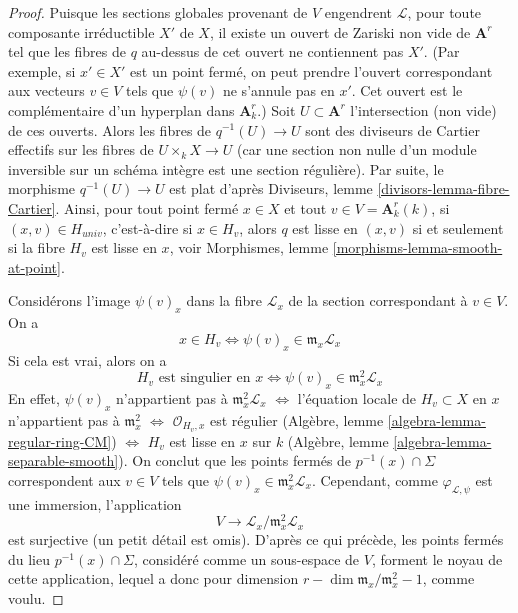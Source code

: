 \begin{proof}
\medskip\noindent
Puisque les sections globales provenant de $V$ engendrent $\mathcal{L}$, pour toute composante irréductible
$X'$ de $X$, il existe un ouvert de Zariski non vide de $\mathbf{A}^r$ tel que les
fibres de $q$ au-dessus de cet ouvert ne contiennent pas $X'$. (Par exemple, si $x' \in X'$
est un point fermé, on peut prendre l'ouvert correspondant aux
vecteurs $v \in V$ tels que $\psi(v)$ ne s'annule pas en $x'$. Cet
ouvert est le complémentaire d'un hyperplan dans $\mathbf{A}^r_k$.)
Soit $U \subset \mathbf{A}^r$ l'intersection (non vide) de ces ouverts.
Alors les fibres de $q^{-1}(U) \to U$ sont des diviseurs de Cartier effectifs
sur les fibres de $U \times_k X \to U$ (car une section non nulle
d'un module inversible sur un schéma intègre est une section régulière). Par suite, le
morphisme $q^{-1}(U) \to U$ est plat d'après
Diviseurs, lemme \ref{divisors-lemma-fibre-Cartier}.
Ainsi, pour tout point fermé $x \in X$ et tout $v \in V = \mathbf{A}^r_k(k)$,
si $(x, v) \in H_{univ}$, c'est-à-dire si $x \in H_v$,
alors $q$ est lisse en $(x, v)$ si et seulement si la fibre
$H_v$ est lisse en $x$, voir
Morphismes, lemme \ref{morphisms-lemma-smooth-at-point}.

\medskip\noindent
Considérons l'image $\psi(v)_x$ dans la fibre $\mathcal{L}_x$
de la section correspondant à $v \in V$. On a
$$
x \in H_v \Leftrightarrow \psi(v)_x \in \mathfrak m_x\mathcal{L}_x
$$
Si cela est vrai, alors on a
$$
H_v\text{ est singulier en }x \Leftrightarrow
\psi(v)_x \in \mathfrak m_x^2\mathcal{L}_x
$$
En effet, $\psi(v)_x$ n'appartient pas à $\mathfrak m_x^2\mathcal{L}_x$
$\Leftrightarrow$
l'équation locale de $H_v \subset X$ en $x$ n'appartient pas
à $\mathfrak m_x^2$
$\Leftrightarrow$
$\mathcal{O}_{H_v, x}$ est régulier
(Algèbre, lemme \ref{algebra-lemma-regular-ring-CM})
$\Leftrightarrow$
$H_v$ est lisse en $x$ sur $k$
(Algèbre, lemme \ref{algebra-lemma-separable-smooth}).
On conclut que les points fermés de $p^{-1}(x) \cap \Sigma$ correspondent
aux $v \in V$ tels que $\psi(v)_x \in \mathfrak m_x^2\mathcal{L}_x$.
Cependant, comme $\varphi_{\mathcal{L}, \psi}$ est une immersion,
l'application
$$
V \longrightarrow \mathcal{L}_x/\mathfrak m_x^2\mathcal{L}_x
$$
est surjective (un petit détail est omis). D'après ce qui précède, les points fermés
du lieu $p^{-1}(x) \cap \Sigma$, considéré comme un sous-espace de $V$,
forment le noyau de cette application, lequel a donc pour dimension
$r - \dim \mathfrak m_x/\mathfrak m_x^2 - 1$, comme voulu.
\end{proof}






